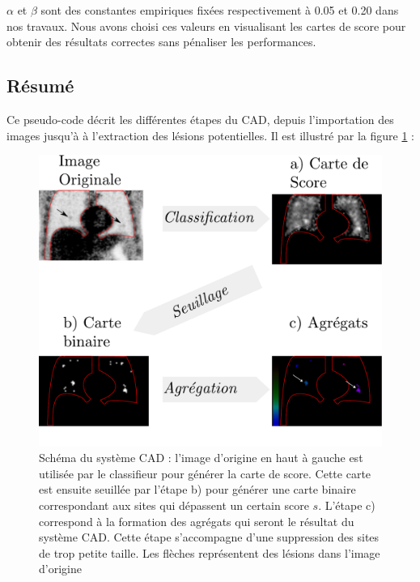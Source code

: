 $\alpha$ et $\beta$ sont des constantes empiriques fixées respectivement à 0.05 et 0.20 dans nos travaux. Nous avons choisi ces valeurs en visualisant les cartes de score pour obtenir des résultats correctes sans pénaliser les performances.

\subsection{Résumé}

Ce pseudo-code décrit les différentes étapes du CAD, depuis l'importation des images jusqu'à à l'extraction des lésions potentielles. Il est illustré par la figure \ref{fig:cheminementCAD} :

\begin{figure}
 \centering
 \includegraphics[width=15cm]{images/cheminementCAD}
 \caption{Schéma du système CAD : l'image d'origine en haut à gauche est utilisée par le classifieur pour générer la carte de score. Cette carte est ensuite seuillée par l'étape b) pour générer une carte binaire correspondant aux sites qui dépassent un certain score $s$. L'étape c) correspond à la formation des agrégats qui seront le résultat du système CAD. Cette étape s'accompagne d'une suppression des sites de trop petite taille. Les flèches représentent des lésions dans l'image d'origine}
 \label{fig:cheminementCAD}
\end{figure}

